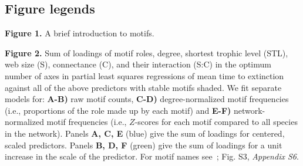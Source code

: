 \documentclass[12pt]{article}
\begin{document}
\begin{spacing}{2.0}
\section*{Figure legends}

        \textbf{Figure 1.} A brief introduction to motifs.

        \vspace{12pt}

        \noindent \textbf{Figure 2.} Sum of loadings of motif roles, degree, shortest trophic level (STL), web size (S), connectance (C), and their interaction (S:C) in the optimum number of axes in partial least squares regressions of mean time to extinction against all of the above predictors with stable motifs shaded. We fit separate models for: \textbf{A-B)} raw motif counts, \textbf{C-D)} degree-normalized motif frequencies (i.e., proportions of the role made up by each motif) and \textbf{E-F)} network-normalized motif frequencies (i.e., $Z$-scores for each motif compared to all species in the network). 
    	Panels \textbf{A, C, E} (blue) give the sum of loadings for centered, scaled predictors.
    	Panels \textbf{B, D, F} (green) give the sum of loadings for a unit increase in the scale of the predictor.
    	For motif names see~\citet{Stouffer2007}; Fig. S3, \emph{Appendix S6}.


    \vspace{12pt}


\end{spacing}
\end{document}

